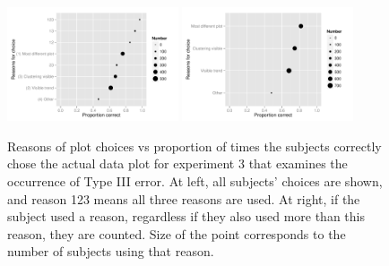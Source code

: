 \documentclass[12pt]{article}
\begin{document}
\begin{figure}[hbtp]
   \centering
       \includegraphics[width=0.45\textwidth]{choice_reason2.pdf}
       \includegraphics[width=0.45\textwidth]{choice_reason3.pdf}
       \caption{Reasons of plot choices vs  proportion of times the subjects correctly chose the actual data plot for experiment 3 that examines the occurrence of Type III error. At left, all subjects' choices are shown, and reason 123 means all three reasons are used. At right, if the subject used a reason, regardless if they also used more than this reason, they are counted. Size of the point corresponds to the number of subjects using that reason.}
       \label{fig:choice_reason}
\end{figure}





%
%
\end{document}
